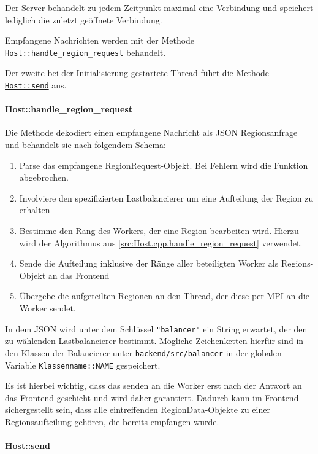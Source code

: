 Der Server behandelt zu jedem Zeitpunkt maximal eine Verbindung und speichert lediglich die zuletzt geöffnete Verbindung.

Empfangene Nachrichten werden mit der Methode \hyperref[cls:Host::handle_region_request]{\texttt{Host::handle\_region\_request}} behandelt.

Der zweite bei der Initialisierung gestartete Thread führt die Methode \hyperref[cls:Host::send]{\texttt{Host::send}} aus.

\paragraph{Host::handle\_region\_request}\label{cls:Host::handle_region_request}

Die Methode dekodiert einen empfangene Nachricht als JSON Regionsanfrage und behandelt sie nach folgendem Schema:

\begin{enumerate}
	\item Parse das empfangene RegionRequest-Objekt. Bei Fehlern wird die Funktion abgebrochen.
	\item Involviere den spezifizierten Lastbalancierer um eine Aufteilung der Region zu erhalten
	\item Bestimme den Rang des Workers, der eine Region bearbeiten wird. Hierzu wird der Algorithmus aus \autoref{src:Host.cpp.handle_region_request} verwendet.
	\item Sende die Aufteilung inklusive der Ränge aller beteiligten Worker als Regions-Objekt an das Frontend
	\item Übergebe die aufgeteilten Regionen an den Thread, der diese per MPI an die Worker sendet.
\end{enumerate}

In dem JSON wird unter dem Schlüssel \texttt{"balancer"} ein String erwartet, der den zu wählenden Lastbalancierer bestimmt.
Mögliche Zeichenketten hierfür sind in den Klassen der Balancierer unter \verb|backend/src/balancer| in der globalen Variable
\verb|Klassenname::NAME| gespeichert.

Es ist hierbei wichtig, dass das senden an die Worker erst nach der Antwort an das Frontend geschieht und wird daher garantiert.
Dadurch kann im Frontend sichergestellt sein, dass alle eintreffenden RegionData-Objekte zu einer Regionsaufteilung gehören,
die bereits empfangen wurde.

\paragraph{Host::send}\label{cls:Host::send}

